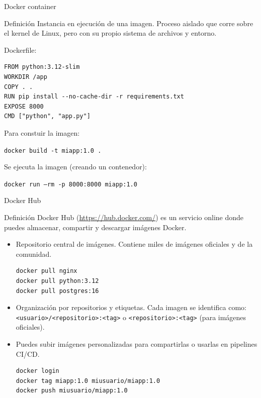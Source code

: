 \documentclass{beamer}
\begin{document}
\begin{frame}[fragile]{Docker container}

\begin{block}{Definición}
Instancia en ejecución de una imagen. Proceso aislado que corre sobre el kernel de Linux, pero con su propio sistema de archivos y entorno.
\end{block}

Dockerfile:
\begin{verbatim}
FROM python:3.12-slim
WORKDIR /app
COPY . .
RUN pip install --no-cache-dir -r requirements.txt
EXPOSE 8000
CMD ["python", "app.py"]
\end{verbatim}

Para constuir la imagen: 

\begin{center}
    \texttt{docker build -t miapp:1.0 .}
\end{center}

Se ejecuta la imagen (creando un contenedor): 

\begin{center}
    \texttt{docker run --rm -p 8000:8000 miapp:1.0}
\end{center}
    
\end{frame}

\begin{frame}[fragile]{Docker Hub}

\begin{block}{Definición}
Docker Hub (\url{https://hub.docker.com/}) es un servicio online donde puedes almacenar, compartir y descargar imágenes Docker.
\end{block}

\begin{itemize}
    \item Repositorio central de imágenes. Contiene miles de imágenes oficiales y de la comunidad.
\begin{verbatim}
docker pull nginx
docker pull python:3.12
docker pull postgres:16
\end{verbatim}


    \item Organización por repositorios y etiquetas. Cada imagen se identifica como: \texttt{<usuario>/<repositorio>:<tag>} o \texttt{<repositorio>:<tag>} (para imágenes oficiales).

    \item Puedes subir imágenes personalizadas para compartirlas o usarlas en pipelines CI/CD.

    \begin{verbatim}
docker login
docker tag miapp:1.0 miusuario/miapp:1.0
docker push miusuario/miapp:1.0
\end{verbatim}
\end{itemize}

\end{frame}
\end{document}
